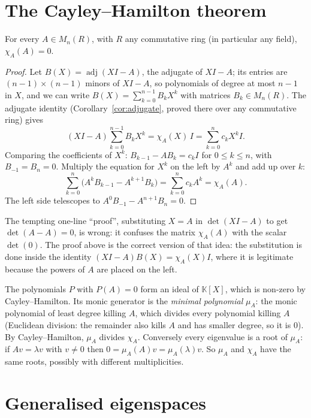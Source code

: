 \section{The Cayley--Hamilton theorem}

\begin{theorem}\label{thm:cayleyhamilton}
For every $A\in M_n(R)$, with $R$ any commutative ring (in particular any field), $\chi_A(A)=0$.
\end{theorem}
\begin{proof}
Let $B(X)=\operatorname{adj}(XI-A)$, the adjugate of $XI-A$; its entries are $(n-1)\times(n-1)$ minors of $XI-A$, so
polynomials of degree at most $n-1$ in $X$, and we can write $B(X)=\sum_{k=0}^{n-1}B_kX^k$ with matrices $B_k\in
M_n(R)$. The adjugate identity (Corollary~\ref{cor:adjugate}, proved there over any commutative ring) gives
\[
(XI-A)\sum_{k=0}^{n-1}B_kX^k=\chi_A(X)\,I=\sum_{k=0}^nc_kX^kI .
\]
Comparing the coefficients of $X^k$: $B_{k-1}-AB_k=c_kI$ for $0\le k\le n$, with $B_{-1}=B_n=0$. Multiply the equation
for $X^k$ on the left by $A^k$ and add up over $k$:
\[
\sum_{k=0}^n\bigl(A^kB_{k-1}-A^{k+1}B_k\bigr)=\sum_{k=0}^nc_kA^k=\chi_A(A).
\]
The left side telescopes to $A^0B_{-1}-A^{n+1}B_n=0$.
\end{proof}

The tempting one-line ``proof'', substituting $X=A$ in $\det(XI-A)$ to get $\det(A-A)=0$, is wrong: it confuses the
matrix $\chi_A(A)$ with the scalar $\det(0)$. The proof above is the correct version of that idea: the substitution is done
inside the identity $(XI-A)B(X)=\chi_A(X)I$, where it is legitimate because the powers of $A$ are placed on the left.

The polynomials $P$ with $P(A)=0$ form an ideal of $\mathbb K[X]$, which is non-zero by Cayley--Hamilton. Its monic
generator is the \emph{minimal polynomial} $\mu_A$: the monic polynomial of least degree killing $A$, which divides every
polynomial killing $A$ (Euclidean division: the remainder also kills $A$ and has smaller degree, so it is $0$). By
Cayley--Hamilton, $\mu_A$ divides $\chi_A$. Conversely every eigenvalue is a root of $\mu_A$: if $Av=\lambda v$ with $v\ne0$ then
$0=\mu_A(A)v=\mu_A(\lambda)v$. So $\mu_A$ and $\chi_A$ have the same roots, possibly with different multiplicities.

\section{Generalised eigenspaces}


